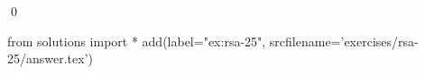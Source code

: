 
\begin{ex} 
  \label{ex:rsa-25}
  
  \qed
\end{ex} 
\begin{python0}
from solutions import *
add(label="ex:rsa-25",
    srcfilename='exercises/rsa-25/answer.tex') 
\end{python0}
